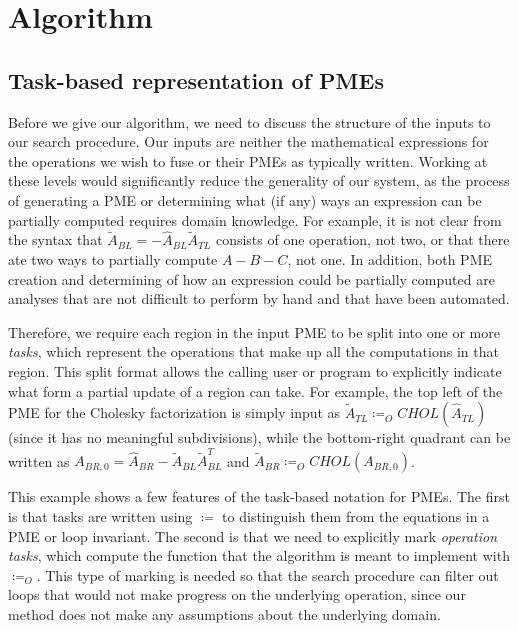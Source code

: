\documentclass[12pt,letterpaper]{article}
\begin{document}
\section{Algorithm}
\subsection{Task-based representation of PMEs}
Before we give our algorithm, we need to discuss the structure of the inputs to our search procedure.
Our inputs are neither the mathematical expressions for the operations we wish to fuse or their PMEs as typically written.
Working at these levels would significantly reduce the generality of our system, as the process of generating a PME or determining what (if any) ways an expression can be partially computed requires domain knowledge.
For example, it is not clear from the syntax that $\widetilde{A}_{BL} = -\hat{A}_{BL}\widetilde{A}_{TL}$ consists of one operation, not two, or that there ate two ways to partially compute $A - B - C$, not one.
In addition, both PME creation and determining of how an expression could be partially computed are analyses that are not difficult to perform by hand and that have been automated.

Therefore, we require each region in the input PME to be split into one or more \emph{tasks}, which represent the operations that make up all the computations in that region.
This split format allows the calling user or program to explicitly indicate what form a partial update of a region can take.
For example, the top left of the PME for the Cholesky factorization is simply input as $\widetilde{A}_{TL} \coloneqq_O CHOL(\hat{A}_{TL})$ (since it has no meaningful subdivisions), while the bottom-right quadrant can be written as $A_{BR, 0} = \hat{A}_{BR} - \widetilde{A}_{BL}\widetilde{A}_{BL}^T$ and $\widetilde{A}_{BR} \coloneqq_O CHOL(A_{BR, 0})$.

This example shows a few features of the task-based notation for PMEs.
The first is that tasks are written using $\coloneqq$ to distinguish them from the equations in a PME or loop invariant.
The second is that we need to explicitly mark \emph{operation tasks}, which compute the function that the algorithm is meant to implement with $\coloneqq_O$.
This type of marking is needed so that the search procedure can filter out loops that would not make progress on the underlying operation, since our method does not make any assumptions about the underlying domain.
\end{document}
